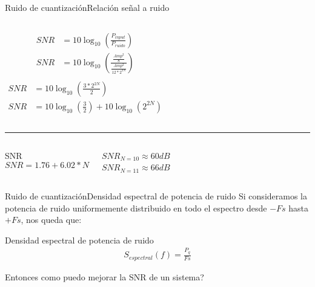  \begin{frame}{Ruido de cuantización}{Relación señal a ruido}
    \begin{columns}[onlytextwidth]
       \begin{align*}
          SNR&=10 \log_{10} \left(\frac{P_{input}}{P_{ruido}} \right)\\
          SNR&=10 \log_{10}\left(\frac{\frac{Amp^2}{8}}{\frac{Amp^2}{12*2^{2N}}} \right) \\
       \end{align*}
       \begin{align*}
          SNR&=10 \log_{10}\left(\frac{3*2^{2N}}{2} \right)\\
          SNR&=10\log_{10}\left(\frac{3}{2}\right)+10\log_{10}\left(2^{2N}\right)
       \end{align*}
    \end{columns}
   \hrule
    \begin{columns}[c]
       \begin{block}{SNR}
          \begin{equation*}
             SNR = 1.76 + 6.02 * N
          \end{equation*}
       \end{block}
    \begin{center}
       {$SNR_{N=10} \approx 60dB$} \\
       {$SNR_{N=11} \approx 66dB$}
    \end{center}
    \end{columns}
    \vspace{3cm}
 \end{frame}
 \begin{frame}{Ruido de cuantización}{Densidad espectral de potencia de ruido}
    Si consideramos la potencia de ruido uniformemente distribuido en todo el espectro desde $-Fs$ hasta $+Fs$, nos queda que:
    \begin{block}{Densidad espectral de potencia de ruido}
       \begin{align*}
          S_{espectral}(f) = \frac{P_q}{Fs}
       \end{align*}
    \end{block}
    Entonces como puedo mejorar la SNR de un sistema?
    \vfill
 \end{frame}
